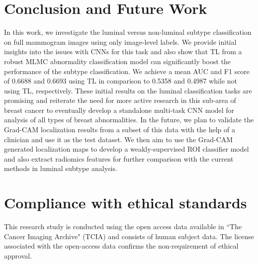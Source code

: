 \documentclass{article}
\begin{document}
\section{Conclusion and Future Work}
\label{sec:typestyle}
In this work, we investigate the luminal versus non-luminal subtype classification on full mammogram images using only image-level labels. We provide initial insights into the issues with CNNs for this task and also show that TL from a robust MLMC abnormality classification model can significantly boost the performance of the subtype classification. We achieve a mean AUC and F1 score of 0.6688 and 0.6693 using TL in comparison to 0.5358 and 0.4987 while not using TL, respectively. These initial results on the luminal classification tasks are promising and reiterate the need for more active research in this sub-area of breast cancer to eventually develop a standalone multi-task CNN model for analysis of all types of breast abnormalities. In the future, we plan to validate the Grad-CAM localization results from a subset of this data with the help of a clinician and use it as the test dataset. We then aim to use the Grad-CAM generated localization maps to develop a weakly-supervised ROI classifier model and also extract radiomics features for further comparison with the current methods in luminal subtype analysis.   














\section{Compliance with ethical standards}
\label{sec:ethics}

This research study is conducted using the open access data available in ``The Cancer Imaging Archive" (TCIA) \cite{cui2021chinese, clark2013cancer} and consists of human subject data. 
The license associated with the open-access data confirms the non-requirement of ethical approval. 













\end{document}
